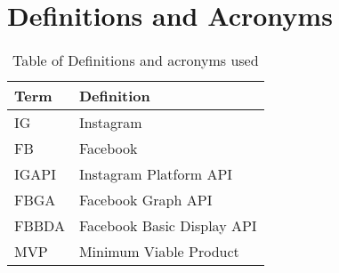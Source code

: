 \section{Definitions and Acronyms}
\begin{table}[ht]
    \centering
    \begin{tabular}{l | l}
        Term & Definition \\
        \hline
        IG & Instagram \\
        FB & Facebook \\
        IGAPI & Instagram Platform API \\
        FBGA & Facebook Graph API \\
        FBBDA & Facebook Basic Display API \\
        MVP & Minimum Viable Product \\
    \end{tabular}
    \caption{Table of Definitions and acronyms used}
    \label{tab: def_ac}
\end{table}



